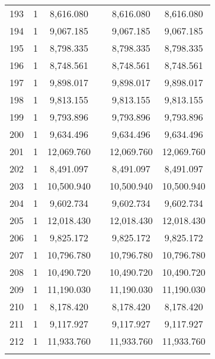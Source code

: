 \begin{table}[!htbp]
\begin{tabular}{@{\extracolsep{5pt}}lccccc}
193 & 1 & 8,616.080 &  & 8,616.080 & 8,616.080 \\ 
194 & 1 & 9,067.185 &  & 9,067.185 & 9,067.185 \\ 
195 & 1 & 8,798.335 &  & 8,798.335 & 8,798.335 \\ 
196 & 1 & 8,748.561 &  & 8,748.561 & 8,748.561 \\ 
197 & 1 & 9,898.017 &  & 9,898.017 & 9,898.017 \\ 
198 & 1 & 9,813.155 &  & 9,813.155 & 9,813.155 \\ 
199 & 1 & 9,793.896 &  & 9,793.896 & 9,793.896 \\ 
200 & 1 & 9,634.496 &  & 9,634.496 & 9,634.496 \\ 
201 & 1 & 12,069.760 &  & 12,069.760 & 12,069.760 \\ 
202 & 1 & 8,491.097 &  & 8,491.097 & 8,491.097 \\ 
203 & 1 & 10,500.940 &  & 10,500.940 & 10,500.940 \\ 
204 & 1 & 9,602.734 &  & 9,602.734 & 9,602.734 \\ 
205 & 1 & 12,018.430 &  & 12,018.430 & 12,018.430 \\ 
206 & 1 & 9,825.172 &  & 9,825.172 & 9,825.172 \\ 
207 & 1 & 10,796.780 &  & 10,796.780 & 10,796.780 \\ 
208 & 1 & 10,490.720 &  & 10,490.720 & 10,490.720 \\ 
209 & 1 & 11,190.030 &  & 11,190.030 & 11,190.030 \\ 
210 & 1 & 8,178.420 &  & 8,178.420 & 8,178.420 \\ 
211 & 1 & 9,117.927 &  & 9,117.927 & 9,117.927 \\ 
212 & 1 & 11,933.760 &  & 11,933.760 & 11,933.760 \\ 
\hline \\[-1.8ex] 
\end{tabular} 
\end{table} 
